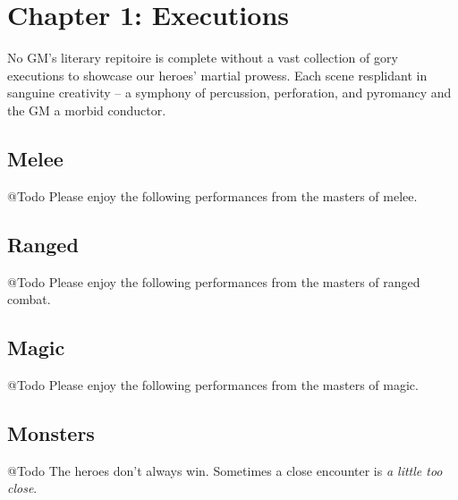 \chapter{Chapter 1: Executions}
No GM's literary repitoire is complete without a vast collection of gory executions to showcase our heroes' martial prowess. Each scene resplidant 
in sanguine creativity -- a symphony of percussion, perforation, and pyromancy and the GM a morbid conductor.

\section{Melee}
@Todo Please enjoy the following performances from the masters of melee.




\section{Ranged}
@Todo Please enjoy the following performances from the masters of ranged combat.




\section{Magic}
@Todo Please enjoy the following performances from the masters of magic.




\section{Monsters}
@Todo The heroes don't always win. Sometimes a close encounter is \textit{a little too close}.




